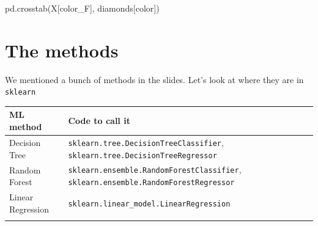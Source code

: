 \documentclass[
  letterpaper,
]{scrbook}
\newenvironment{Shaded}{\begin{snugshade}}{\end{snugshade}}
\newcommand{\NormalTok}[1]{#1}
\newcommand{\StringTok}[1]{\textcolor[rgb]{0.31,0.60,0.02}{#1}}
\begin{document}
\begin{Shaded}
\begin{Highlighting}[]
\NormalTok{pd.crosstab(X[}\StringTok{\textquotesingle{}color\_F\textquotesingle{}}\NormalTok{], diamonds[}\StringTok{\textquotesingle{}color\textquotesingle{}}\NormalTok{])}
\end{Highlighting}
\end{Shaded}

\hypertarget{the-methods}{%
\section{The methods}\label{the-methods}}

We mentioned a bunch of methods in the slides. Let's look at where they are in \texttt{sklearn}

\begin{longtable}[]{@{}ll@{}}
\toprule
\begin{minipage}[b]{0.26\columnwidth}\raggedright
ML method\strut
\end{minipage} & \begin{minipage}[b]{0.68\columnwidth}\raggedright
Code to call it\strut
\end{minipage}\tabularnewline
\midrule
\endhead
\begin{minipage}[t]{0.26\columnwidth}\raggedright
Decision Tree\strut
\end{minipage} & \begin{minipage}[t]{0.68\columnwidth}\raggedright
\texttt{sklearn.tree.DecisionTreeClassifier}, \texttt{sklearn.tree.DecisionTreeRegressor}\strut
\end{minipage}\tabularnewline
\begin{minipage}[t]{0.26\columnwidth}\raggedright
Random Forest\strut
\end{minipage} & \begin{minipage}[t]{0.68\columnwidth}\raggedright
\texttt{sklearn.ensemble.RandomForestClassifier}, \texttt{sklearn.ensemble.RandomForestRegressor}\strut
\end{minipage}\tabularnewline
\begin{minipage}[t]{0.26\columnwidth}\raggedright
Linear Regression\strut
\end{minipage} & \begin{minipage}[t]{0.68\columnwidth}\raggedright
\texttt{sklearn.linear\_model.LinearRegression}\strut
\end{minipage}\tabularnewline
\begin{minipage}[t]{0.26\columnwidth}\raggedright

\end{minipage}
\end{longtable}
\end{document}
